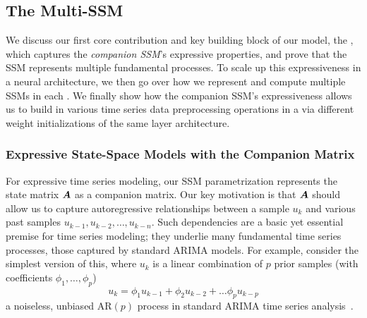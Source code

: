 
\subsection{The Multi-SSM \ourmethodunit{}}

\label{sec:expressive_ssm_layer}
We discuss our first core contribution and key building block of our model, the \ourmethodunit{}, which captures the \emph{companion SSM}'s expressive properties, and prove that the SSM represents multiple fundamental processes. 
To scale up this expressiveness in a neural architecture, we then go over how we represent and compute multiple SSMs in each \ourmethodunit{}. We finally 
show how the companion SSM's expressiveness allows us to build in various time series data preprocessing operations in a \ourmethodunit{} via different weight initializations of the same layer architecture. 


\subsubsection{Expressive State-Space Models with the Companion Matrix}
\label{sec:expressive_ssm_with_companion}
For expressive time series modeling, our SSM parametrization represents the state matrix $\boldsymbol{A}$ as a companion matrix.
%
Our key motivation is that $\boldsymbol{A}$ should allow us to capture autoregressive relationships between a sample $u_k$ and various past samples $u_{k - 1}, u_{k - 2}, \ldots, u_{k - n}$.
Such dependencies are a basic yet essential premise for time series modeling; they underlie many fundamental time series processes, \eg{} those captured by standard ARIMA models.
For example, consider the simplest version of this, where $u_k$ is a linear combination of $p$ prior samples
(with coefficients $\phi_1, \ldots, \phi_p$)
\begin{equation}
    u_k = \phi_1 u_{k - 1} + \phi_2 u_{k - 2} + \ldots \phi_p u_{k - p}
\label{eq:ar_p_model}
\end{equation}
\ie{} a noiseless, unbiased $\text{AR}(p)$ process in standard ARIMA time series analysis~\citep{box1970time}.

